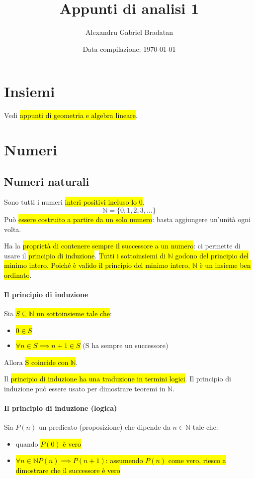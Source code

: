 \documentclass[a4paper,11pt,oneside,dvipsnames]{article}
\title{Appunti di analisi 1}
\author{Alexandru Gabriel Bradatan}
\date{Data compilazione: \today}
\begin{document}
\maketitle
\tableofcontents

\section{Insiemi}
Vedi \hl{appunti di geometria e algebra lineare}.

\section{Numeri}
\subsection{Numeri naturali}
Sono tutti i numeri \hl{interi positivi incluso lo 0}.
\[
    \mathbb{N} = \{0, 1, 2, 3, \dots \}
\]
Può \hl{essere costruito a partire da un solo numero}: basta aggiungere un'unità
ogni volta.

Ha la \hl{proprietà di contenere sempre il successore a un numero}: ci
permette di usare il \hl{principio di induzione}. \hl{Tutti i sottoinsiemi di 
$\mathbb{N}$ godono del principio del minimo intero. Poiché è valido il 
principio del minimo intero, $\mathbb{N}$ è un insieme ben ordinato}.

\paragraph{Il principio di induzione} Sia \hl{$S \subseteq \mathbb{N}$ un 
sottoinsieme tale che}:
\begin{itemize}
    \item \hl{$0 \in S$}
    \item \hl{$\forall n \in S \implies n+1 \in S$} (S ha sempre un successore)
\end{itemize}

Allora \hl{S coincide con $\mathbb{N}$}.

Il \hl{principio di induzione ha una traduzione in termini logici}. Il
principio di induzione può essere usato per dimostrare teoremi in $\mathbb{N}$.

\paragraph{Il principio di induzione (logica)} Sia $P(n)$ un predicato 
(proposizione) che dipende da $n \in \mathbb{N}$ tale che:
\begin{itemize}
    \item quando \hl{$P(0)$ è vero}
    \item \hl{$\forall n \in \mathbb{N} P(n) \implies P(n+1)$: assumendo $P(n)$ come
        vero, riesco a dimostrare che il successore è vero}
\end{itemize}
\end{document}
